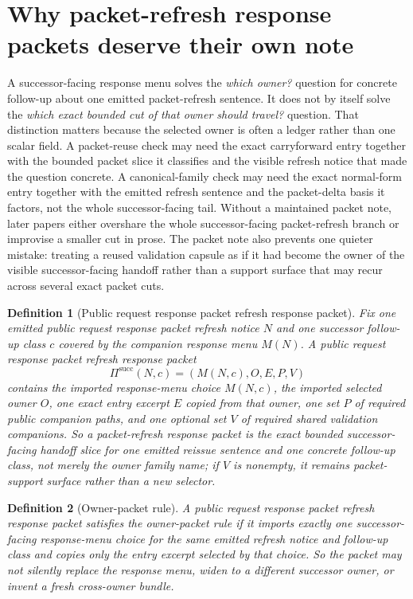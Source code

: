 \documentclass[11pt]{article}
\newtheorem{definition}{Definition}
\begin{document}
\section{Why packet-refresh response packets deserve their own note}
A successor-facing response menu solves the \emph{which owner?} question for concrete follow-up about one emitted packet-refresh sentence.
It does not by itself solve the \emph{which exact bounded cut of that owner should travel?} question.
That distinction matters because the selected owner is often a ledger rather than one scalar field.
A packet-reuse check may need the exact carryforward entry together with the bounded packet slice it classifies and the visible refresh notice that made the question concrete.
A canonical-family check may need the exact normal-form entry together with the emitted refresh sentence and the packet-delta basis it factors, not the whole successor-facing tail.
Without a maintained packet note, later papers either overshare the whole successor-facing packet-refresh branch or improvise a smaller cut in prose. The packet note also prevents one quieter mistake: treating a reused validation capsule as if it had become the owner of the visible successor-facing handoff rather than a support surface that may recur across several exact packet cuts.

\begin{definition}[Public request response packet refresh response packet]
Fix one emitted public request response packet refresh notice $N$ and one successor follow-up class $c$ covered by the companion response menu $M(N)$.
A \emph{public request response packet refresh response packet}
\[
\Pi^{\mathrm{succ}}(N,c)=(M(N,c),O,E,P,V)
\]
contains the imported response-menu choice $M(N,c)$, the imported selected owner $O$, one exact entry excerpt $E$ copied from that owner, one set $P$ of required public companion paths, and one optional set $V$ of required shared validation companions.
So a packet-refresh response packet is the exact bounded successor-facing handoff slice for one emitted reissue sentence and one concrete follow-up class, not merely the owner family name; if $V$ is nonempty, it remains packet-support surface rather than a new selector.
\end{definition}

\begin{definition}[Owner-packet rule]
A public request response packet refresh response packet satisfies the \emph{owner-packet rule} if it imports exactly one successor-facing response-menu choice for the same emitted refresh notice and follow-up class and copies only the entry excerpt selected by that choice.
So the packet may not silently replace the response menu, widen to a different successor owner, or invent a fresh cross-owner bundle.
\end{definition}
\end{document}

